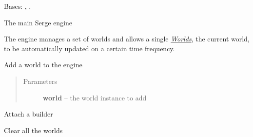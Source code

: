 \documentclass[letterpaper,10pt,english]{sphinxmanual}
\begin{document}
\begin{fulllineitems}
\label{engine:serge.engine.Engine}
Bases: {\hyperref[common:serge.common.Loggable]{}}, {\hyperref[common:serge.serialize.Serializable]{}}, {\hyperref[common:serge.common.EventAware]{}}

The main Serge engine

The engine manages a set of worlds and allows
a single {\hyperref[world::doc]{\emph{Worlds}}}, the current world, to be automatically
updated on a certain time frequency.

\begin{fulllineitems}
\label{engine:serge.engine.Engine.addWorld}
Add a world to the engine
\begin{quote}\begin{description}
\item[{Parameters}] \leavevmode
\textbf{world} -- the world instance to add

\end{description}\end{quote}

\end{fulllineitems}


\begin{fulllineitems}
\label{engine:serge.engine.Engine.attachBuilder}
Attach a builder

\end{fulllineitems}


\begin{fulllineitems}
\label{engine:serge.engine.Engine.clearWorlds}
Clear all the worlds

\end{fulllineitems}



\end{fulllineitems}
\end{document}
